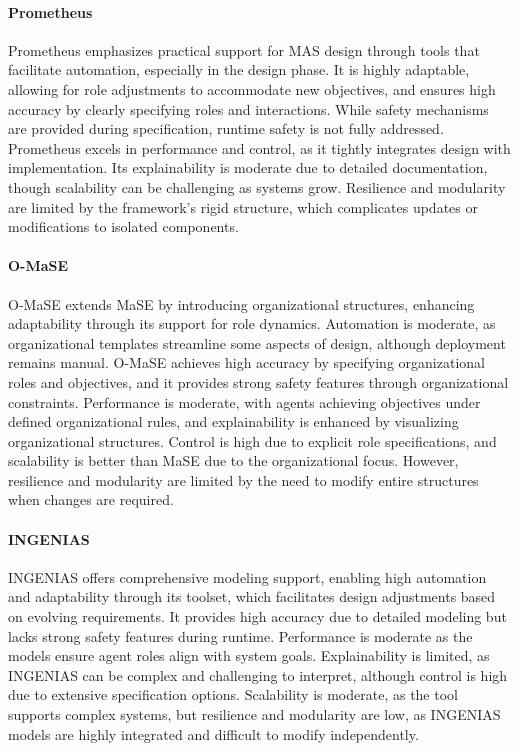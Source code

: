 \documentclass[sigconf,anonymous]{aamas}
\begin{document}
\paragraph{Prometheus}
Prometheus \cite{padgham2005prometheus} emphasizes practical support for MAS design through tools that facilitate automation, especially in the design phase. It is highly adaptable, allowing for role adjustments to accommodate new objectives, and ensures high accuracy by clearly specifying roles and interactions. While safety mechanisms are provided during specification, runtime safety is not fully addressed. Prometheus excels in performance and control, as it tightly integrates design with implementation. Its explainability is moderate due to detailed documentation, though scalability can be challenging as systems grow. Resilience and modularity are limited by the framework's rigid structure, which complicates updates or modifications to isolated components.

\paragraph{O-MaSE}
O-MaSE \cite{garcia2007engineering} extends MaSE by introducing organizational structures, enhancing adaptability through its support for role dynamics. Automation is moderate, as organizational templates streamline some aspects of design, although deployment remains manual. O-MaSE achieves high accuracy by specifying organizational roles and objectives, and it provides strong safety features through organizational constraints. Performance is moderate, with agents achieving objectives under defined organizational rules, and explainability is enhanced by visualizing organizational structures. Control is high due to explicit role specifications, and scalability is better than MaSE due to the organizational focus. However, resilience and modularity are limited by the need to modify entire structures when changes are required.

\paragraph{INGENIAS}
INGENIAS \cite{gomez2003ingenias} offers comprehensive modeling support, enabling high automation and adaptability through its toolset, which facilitates design adjustments based on evolving requirements. It provides high accuracy due to detailed modeling but lacks strong safety features during runtime. Performance is moderate as the models ensure agent roles align with system goals. Explainability is limited, as INGENIAS can be complex and challenging to interpret, although control is high due to extensive specification options. Scalability is moderate, as the tool supports complex systems, but resilience and modularity are low, as INGENIAS models are highly integrated and difficult to modify independently.
\end{document}
